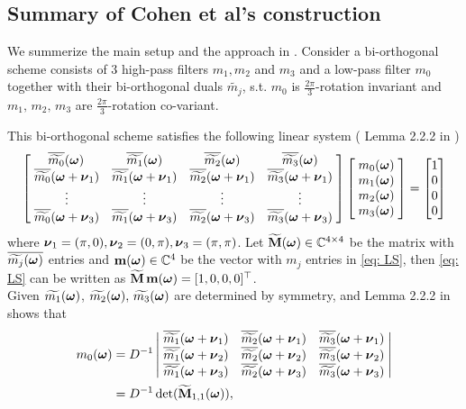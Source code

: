 \subsection{Summary of Cohen et al's construction}\label{subsec: cohen-summary}
We summerize the main setup and the approach in \cite{cohen1993compactly}. Consider a bi-orthogonal scheme consists of 3 high-pass filters $m_1,m_2$ and $m_3$ and a low-pass filter $m_0$ together with their bi-orthogonal duals $\widetilde{m_j}$, s.t.
$m_0$ is $\frac{2\pi}{3}$-rotation invariant and $m_1,\, m_2,\, m_3$ are $\frac{2\pi}{3}$-rotation co-variant.

This bi-orthogonal scheme satisfies the following linear system (
Lemma 2.2.2 in \cite{cohen1993compactly} )
\begin{align}\label{eq: LS}
\begin{bmatrix}
    \, \overline{\widetilde{m_0}}(\boldsymbol{\omega}) &  \overline{\widetilde{m_1}}(\boldsymbol{\omega}) &  \overline{\widetilde{m_2}}(\boldsymbol{\omega}) &  \overline{\widetilde{m_3}}(\boldsymbol{\omega})\; \\
    \;\overline{\widetilde{m_{0}}}(\boldsymbol{\omega} + \boldsymbol{\nu}_{1}) & \overline{\widetilde{m_{1}}}(\boldsymbol{\omega} + \boldsymbol{\nu}_{1})  & \overline{\widetilde{m_{2}}}(\boldsymbol{\omega} + \boldsymbol{\nu}_{1})  & \overline{\widetilde{m_{3}}}(\boldsymbol{\omega} + \boldsymbol{\nu}_{1})\; \\
    \;\vdots & \vdots & \vdots & \vdots \; \\
    \;\overline{\widetilde{m_{0}}}(\boldsymbol{\omega} + \boldsymbol{\nu}_{3}) & \overline{\widetilde{m_{1}}}(\boldsymbol{\omega} + \boldsymbol{\nu}_{3}) & \overline{\widetilde{m_{2}}}(\boldsymbol{\omega} + \boldsymbol{\nu}_{3}) & \overline{\widetilde{m_{3}}}(\boldsymbol{\omega} + \boldsymbol{\nu}_{3})\;
\end{bmatrix}
\begin{bmatrix}
\;m_{0}(\boldsymbol{\omega})\; \\
\;m_{1}(\boldsymbol{\omega})\; \\
\;m_{2}(\boldsymbol{\omega})\; \\
\;m_{3}(\boldsymbol{\omega})\; 
\end{bmatrix} 
=
\begin{bmatrix}
1\\
0\\
0\\
0
\end{bmatrix}
\end{align}
 where $\boldsymbol{\nu}_1 = (\pi,0),\boldsymbol{\nu}_2 = (0,\pi),\boldsymbol{\nu}_3=(\pi,\pi)$.
 Let $\widetilde{\mathbf{M}}(\boldsymbol{\omega})\in\mathbb{C}^{4\times 4}$ be the matrix with $\overline{\widetilde{m_{j}}(\boldsymbol{\omega})}$ entries and $\mathbf{m}(\boldsymbol{\omega})\in\mathbb{C}^4$ be the vector with $m_j$ entries in \eqref{eq: LS}, then \eqref{eq: LS} can be written as \(\widetilde{\mathbf{M}}\, \mathbf{m} (\boldsymbol{\omega})= [1,0,0,0]^\top\).\\
Given $\widetilde{m_{1}}(\boldsymbol{\omega})$, $\widetilde{m_{2}}(\boldsymbol{\omega}),\,\widetilde{m_{3}}(\boldsymbol{\omega})$ are determined by symmetry, and Lemma 2.2.2 in \cite{cohen1993compactly} shows that
\begin{align}\label{eq: m0-sol}
m_0(\V{\omega}) &= D^{-1}%
\left|
\begin{matrix}
    \; \sbarmn{1}{1}  & \sbarmn{2}{1}  & \sbarmn{3}{1}\; \\
    \; \sbarmn{1}{2}  & \sbarmn{2}{2}  & \sbarmn{3}{2}\; \\
    \; \sbarmn{1}{3} & \sbarmn{2}{3} & \sbarmn{3}{3}\;
\end{matrix}
\right| \notag\\
&= D^{-1}\det(\widetilde{\mathbf{M}}_{1,1}(\V{\omega})),
\end{align}
